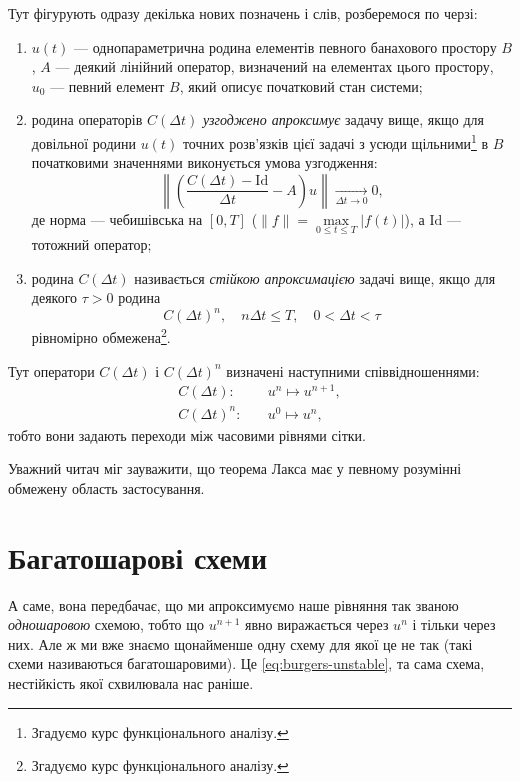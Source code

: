 Тут фігурують одразу декілька нових позначень і слів, розберемося по черзі:
\begin{enumerate}
    \item $u(t)$ --- однопараметрична родина елементів певного банахового простору $B$, $A$ --- деякий лінійний оператор, визначений на елементах цього простору, $u_0$ --- певний елемент $B$, який описує початковий стан системи;
    \item родина операторів $C(\Delta t)$ \textit{узгоджено апроксимує} задачу вище, якщо для довільної родини $u(t)$ точних розв'язків цієї задачі з усюди щільними\footnote{Згадуємо курс функціонального аналізу.} в $B$ початковими значеннями виконується умова узгодження:
    \begin{equation}
        \left\| \left( \frac{C(\Delta t) - \text{Id}}{\Delta t} - A \right) u \right\| \xrightarrow[\Delta t \to 0]{} 0,
    \end{equation}
    де норма --- чебишівська на $[0, T]$ ($\|f\| = \max\limits_{0 \le t \le T} |f(t)|$), а $\text{Id}$ --- тотожний оператор;
    \item родина $C(\Delta t)$ називається \textit{стійкою апроксимацією} задачі вище, якщо для деякого $\tau > 0$ родина
    \begin{equation}
        C(\Delta t)^n, \quad n \Delta t \le T, \quad 0 < \Delta t < \tau
    \end{equation}
    рівномірно обмежена\footnote{Згадуємо курс функціонального аналізу.}.
\end{enumerate}

Тут оператори $C(\Delta t)$ і $C(\Delta t)^n$ визначені наступними співвідношеннями: 
\begin{align}
    C(\Delta t): & \quad u^n \mapsto u^{n + 1}, \\
    C(\Delta t)^n: & \quad u^0 \mapsto u^n,
\end{align}
тобто вони задають переходи між часовими рівнями сітки. \medskip

Уважний читач міг зауважити, що теорема Лакса має у певному розумінні обмежену область застосування.

\section{Багатошарові схеми}

А саме, вона передбачає, що ми апроксимуємо наше рівняння так званою \textit{одношаровою} схемою, тобто що $u^{n + 1}$ явно виражається через $u^n$ і тільки через них. Але ж ми вже знаємо щонайменше одну схему для якої це не так (такі схеми називаються багатошаровими). Це \eqref{eq:burgers-unstable}, та сама схема, нестійкість якої схвилювала нас раніше. \medskip

